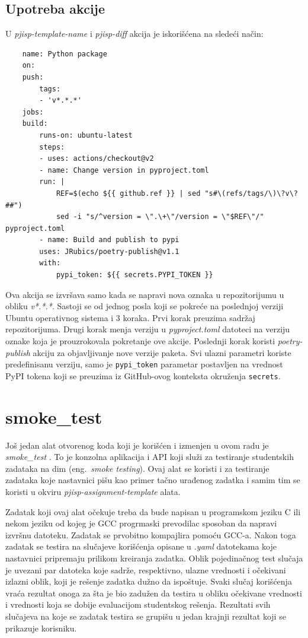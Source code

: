 \documentclass[12pt]{report}
\begin{document}
\subsection{Upotreba akcije}
U \textit{pjisp-template-name} i \textit{pjisp-diff} akcija je iskorišćena na sledeći način:
\begin{samepage}
    \begin{verbatim}
    name: Python package
    on:
    push:
        tags:
        - 'v*.*.*'
    jobs:
    build:
        runs-on: ubuntu-latest
        steps:
        - uses: actions/checkout@v2
        - name: Change version in pyproject.toml
        run: |
            REF=$(echo ${{ github.ref }} | sed "s#\(refs/tags/\)\?v\?##")
            sed -i "s/^version = \".\+\"/version = \"$REF\"/" pyproject.toml
        - name: Build and publish to pypi
        uses: JRubics/poetry-publish@v1.1
        with:
            pypi_token: ${{ secrets.PYPI_TOKEN }}
    \end{verbatim}
\end{samepage}

Ova akcija se izvršava samo kada se napravi nova oznaka u repozitorijumu u obliku \textit{v*.*.*}. Sastoji se od jednog posla koji se pokreće na poslednjoj verziji Ubuntu operativnog sistema i 3 koraka. Prvi korak preuzima sadržaj repozitorijuma. Drugi korak menja verziju u \textit{pyproject.toml} datoteci na verziju oznake koja je prouzrokovala pokretanje ove akcije. Poslednji korak koristi \textit{poetry-publish} akciju za objavljivanje nove verzije paketa. Svi ulazni parametri koriste predefinisanu verziju, samo je \texttt{pypi\_token} parametar postavljen na vrednost PyPI tokena koji se preuzima iz GitHub-ovog konteksta okruženja \texttt{secrets}.

\section{smoke\_test}
Još jedan alat otvorenog koda koji je korišćen i izmenjen u ovom radu je \textit{smoke\_test} \cite{smoke-test}. To je konzolna aplikacija i API koji služi za testiranje studentskih zadataka na dim (eng.\ \textit{smoke testing}). Ovaj alat se koristi i za testiranje zadataka koje nastavnici pišu kao primer tačno urađenog zadatka i samim tim se koristi u okviru \textit{pjisp-assignment-template} alata.

Zadatak koji ovaj alat očekuje treba da bude napisan u programskom jeziku C ili nekom jeziku od kojeg je GCC progrmaski prevodilac sposoban da napravi izvršnu datoteku. Zadatak se prvobitno kompajlira pomoću GCC-a. Nakon toga zadatak se testira na slučajeve korišćenja opisane u \textit{.yaml} datotekama koje nastavnici pripremaju prilikom kreiranja zadatka. Oblik pojedinačnog test slučaja je uvezani par datoteka koje sadrže, respektivno, ulazne vrednosti i očekivani izlazni oblik, koji je rešenje zadatka dužno da ispoštuje. Svaki slučaj korišćenja vraća rezultat onoga za šta je bio zadužen da testira u obliku očekivane vrednosti i vrednosti koja se dobije evaluacijom studentskog rešenja. Rezultati svih slučajeva na koje se zadatak testira se grupišu u jedan krajnji rezultat koji se prikazuje korisniku.
\end{document}
